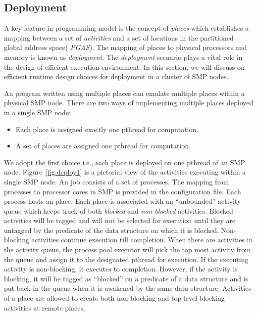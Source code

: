 \subsection{Deployment}
\label{sec:deploy}

A key feature in \Xten{} programming model is the concept of {\it
places} which establishes a mapping between a set of {\it activities}
and a set of locations in the partitioned global address space({\it
PGAS}). The mapping of places to physical processors and memory is
known as {\it deployment}. The {\it deployment} scenario plays a vital
role in the design of efficient \Xten{} execution environment. In this
section, we will discuss on efficient \Xten{} runtime design choices
for deployment in a cluster of SMP nodes.

An \Xten{} program written using multiple places can emulate multiple
places within a physical SMP node. There are two ways of implementing
multiple places deployed in a single SMP node:

\begin{itemize}
	\item Each \Xten{} place is assigned exactly one pthread for computation.

	\item A set of \Xten{} places are assigned one pthread for computation.
\end{itemize}

We adopt the first choice i.e., each \Xten{} place is deployed on one
pthread of an SMP node. Figure~\ref{fig:deploy1} is a pictorial view of
the activities executing within a single SMP node. An \Xten{} job
consists of a set of \Xten{} processes. The mapping from processes to
processor cores in SMP is provided in the configuration file. Each
\Xten{} process hosts an \Xten{} place. Each \Xten{} place is associated
with an ``unbounded'' activity queue which keeps track of both {\it
blocked} and {\it non-blocked} activities. Blocked activities will be
tagged and will not be selected for execution until they are untagged by
the predicate of the data structure on which it is blocked. Non-blocking
activities continue execution till completion. When there are activities
in the activity queue, the \Xten{} process pool executor will pick the
top most activity from the queue and assign it to the designated pthread
for execution.  If the executing activity is non-blocking, it executes
to completion. However, if the activity is blocking, it will be tagged
as ``blocked'' on a predicate of a data structure and is put back in the
queue when it is awakened by the same data structure. Activities of a
\Xten{} place are allowed to create both non-blocking and top-level
blocking activities at remote places.

